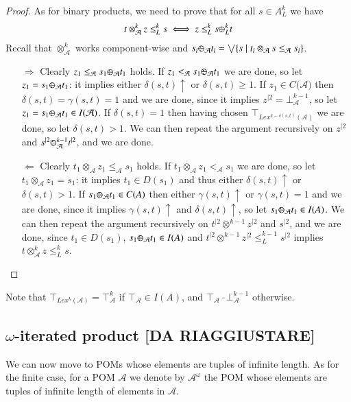 \documentclass[a4paper]{elsarticle}
\newcommand{\1}{\mathbf{1}}
\def\odiv{{ \ominus\hspace{-8pt}:}\;}
\begin{document}
\begin{proof}
As for binary products, we need to prove that for all $s \in A^k_L$ we have
$$t \otimes^k_\mathcal{A} z \leq^k_L s \iff z \leq^k_L s \odiv^k_L t$$
%
Recall that $\otimes^k_\mathcal{A}$ works component-wise and 
$s_i \odiv_\mathcal{A} t_i = \bigvee \{s \mid t_i \otimes_\mathcal{A} s \leq_\mathcal{A} s_i\}$.

\begin{itemize}
\item[$\Rightarrow$] Clearly $z_1 \leq_\mathcal{A} s_1 \odiv_\mathcal{A} t_1$ holds.
If $z_1 <_\mathcal{A} s_1 \odiv_\mathcal{A} t_1$ we are done, so let 
$z_1 = s_1 \odiv_\mathcal{A} t_1$: it implies either $\delta(s,t)\uparrow$ or $\delta(s,t) \geq 1$.
If $z_1 \in C(\mathcal{A)}$ then $\delta(s,t) = \gamma(s,t) = 1$ and we are done, 
since it implies $z^{\mid 2} = \bot^{k-1}_\mathcal{A}$, so let $z_1 = s_1 \odiv_\mathcal{A} t_1 \in I(\mathcal{A)}$.
If $\delta(s,t) = 1$ then having chosen $\top_{Lex^{k-\delta(s,t)}(\mathcal{A})}$ we are done, so let $\delta(s,t) > 1$.
We can then repeat the argument recursively on $z^{\mid 2}$ and $s^{\mid 2} \odiv^{k-1}_\mathcal{A} t^{\mid 2}$, 
and we are done.

\item[$\Leftarrow$]
Clearly $t_1 \otimes_\mathcal{A} z_1 \leq_\mathcal{A} s_1$ holds.
If $t_1 \otimes_\mathcal{A} z_1 <_\mathcal{A} s_1$ we are done, so let 
$t_1 \otimes_\mathcal{A} z_1 = s_1$: it implies $t_1 \in D(s_1)$ and thus either $\delta(s,t)\uparrow$ or $\delta(s,t) > 1$.
If $s_1 \odiv_\mathcal{A} t_1 \in C(A)$ then either $\gamma(s,t) \uparrow$ or $\gamma(s,t)=1$
and we are done, since it implies $\gamma(s,t)\uparrow$ and $\delta(s,t)\uparrow$,
so let $s_1 \odiv_\mathcal{A} t_1 \in I(A)$.
We can then repeat the argument recursively on $t^{\mid 2} \otimes^{k-1} z^{\mid 2}$ and
$s^{\mid 2}$, and we are done,
since $t_1 \in D(s_1)$,
$s_1 \odiv_\mathcal{A} t_1 \in I(A)$ 
and $t^{\mid 2} \otimes^{k-1} z^{\mid 2} \leq^{k-1}_L s^{\mid 2}$
implies 
$t \otimes^k_\mathcal{A} z \leq^k_L s$.
\end{itemize}
\end{proof}

Note that $\top_{Lex^k(\mathcal{A})} = \top^k_\mathcal{A}$
if $\top_\mathcal{A} \in I(A)$, and  $\top_\mathcal{A} \cdot \bot^{k-1}_\mathcal{A}$ 
otherwise.

\subsection{$\omega$-iterated product [DA RIAGGIUSTARE]}\label{sec:infinite}
We can now move to POMs whose elements are tuples of infinite length.
As for the finite case, for a POM $\mathcal{A}$ we denote by $\mathcal{A}^\omega$
the POM whose elements are tuples of infinite length
of elements in $\mathcal{A}$.
\end{document}
